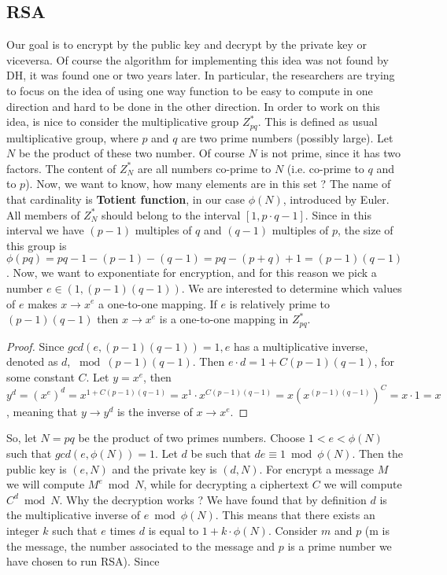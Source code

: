 \documentclass[11pt]{article}
\begin{document}
\subsection{RSA}
Our goal is to encrypt by the public key and decrypt by the private key or viceversa. Of course the algorithm for implementing this idea was not found by DH, it was found one or two years later. In particular, the researchers are trying to focus on the idea of using one way function to be easy to compute in one direction and hard to be done in the other direction. In order to work on this idea, is nice to consider the multiplicative group $Z_{pq}^{*}$. This is defined as usual multiplicative group, where $p$ and $q$ are two prime numbers (possibly large). Let $N$ be the product of these two number. Of course $N$ is not prime, since it has two factors. The content of $Z_N^{*}$ are all numbers co-prime to $N$ (i.e. co-prime to $q$ and to $p$). Now, we want to know, how many elements are in this set ? The name of that cardinality is \textbf{Totient function}, in our case $\phi(N)$, introduced by Euler. All members of $Z_N^{*}$ should belong to the interval $[1, p \cdot q - 1]$. Since in this interval we have $(p - 1)$ multiples of $q$ and $(q - 1)$ multiples of $p$, the size of this group is $\phi(pq) = pq - 1 - (p - 1) - (q - 1) = pq - (p + q) + 1 = (p - 1)(q - 1)$. Now, we want to exponentiate for encryption, and for this reason we pick a number $e \in (1, (p - 1)(q - 1))$. We are interested to determine which values of $e$ makes $x \rightarrow x^e$ a one-to-one mapping. If $e$ is relatively prime to $(p - 1)(q - 1)$ then $x \rightarrow x^e$ is a one-to-one mapping in $Z_{pq}^{*}$.
\begin{proof}
Since $gcd(e, (p - 1)(q - 1)) = 1, e$ has a multiplicative inverse, denoted as $d$, $\bmod (p - 1)(q - 1)$. Then $e \cdot d = 1 + C (p - 1)(q - 1)$, for some constant $C$. Let $y = x^e$, then $y^d = (x^e)^d = x^{1 + C(p - 1)(q - 1)} = x^1 \cdot x^{C(p - 1)(q - 1)} = x(x^{(p - 1)(q - 1)})^{C} = x \cdot 1 = x$, meaning that $y \rightarrow y^d$ is the inverse of $x \rightarrow x^e$.
\end{proof}
So, let $N = pq$ be the product of two primes numbers. Choose $1 < e < \phi(N)$ such that $gcd(e, \phi(N)) = 1$. Let $d$ be such that $de \equiv 1 \bmod \phi(N)$. Then the public key is $(e, N)$ and the private key is $(d, N)$. For encrypt a message $M$ we will compute $M^e \bmod N$, while for decrypting a ciphertext $C$ we will compute $C^d \bmod N$. Why the decryption works ? We have found that by definition $d$ is the multiplicative inverse of $e \bmod \phi(N)$. This means that there exists an integer $k$ such that $e$ times $d$ is equal to $1 + k \cdot \phi(N)$. Consider $m$ and $p$ (m is the message, the number associated to the message and $p$ is a prime number we have chosen to run RSA). Since
\end{document}

